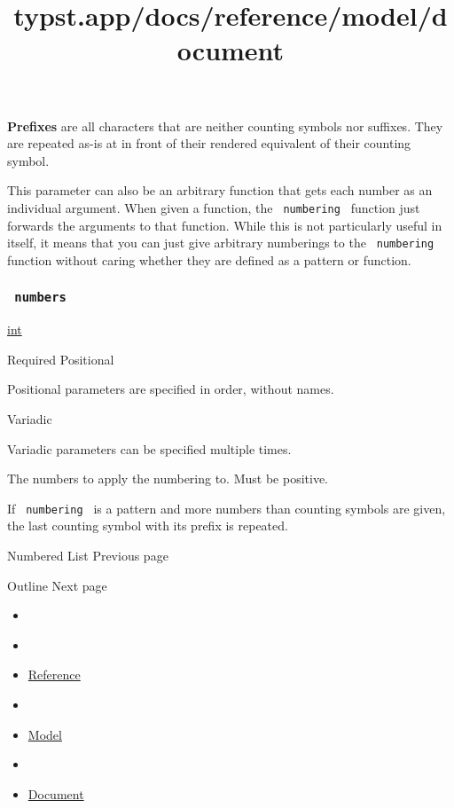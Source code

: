 \textbf{Prefixes} are all characters that are neither counting symbols
nor suffixes. They are repeated as-is at in front of their rendered
equivalent of their counting symbol.

This parameter can also be an arbitrary function that gets each number
as an individual argument. When given a function, the
\texttt{\ numbering\ } function just forwards the arguments to that
function. While this is not particularly useful in itself, it means that
you can just give arbitrary numberings to the \texttt{\ numbering\ }
function without caring whether they are defined as a pattern or
function.

\subsubsection{\texorpdfstring{\texttt{\ numbers\ }}{ numbers }}\label{parameters-numbers}

\href{/docs/reference/foundations/int/}{int}

{Required} {{ Positional }}

\label{parameters-numbers-positional-tooltip}
Positional parameters are specified in order, without names.

{{ Variadic }}

\label{parameters-numbers-variadic-tooltip}
Variadic parameters can be specified multiple times.

The numbers to apply the numbering to. Must be positive.

If \texttt{\ numbering\ } is a pattern and more numbers than counting
symbols are given, the last counting symbol with its prefix is repeated.

\href{/docs/reference/model/enum/}{\pandocbounded{}}

{ Numbered List } { Previous page }

\href{/docs/reference/model/outline/}{\pandocbounded{}}

{ Outline } { Next page }


\title{typst.app/docs/reference/model/document}

\begin{itemize}
\tightlist
\item
  \href{/docs}{}
\item
  
\item
  \href{/docs/reference/}{Reference}
\item
  
\item
  \href{/docs/reference/model/}{Model}
\item
  
\item
  \href{/docs/reference/model/document/}{Document}
\end{itemize}

